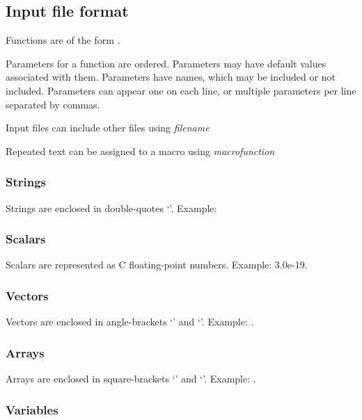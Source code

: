 \documentclass{book}
\begin{document}
\subsection{Input file format}

Functions are of the form .

Parameters for a function are ordered.  Parameters may have default
values associated with them.  Parameters have names, which may be
included or not included.  Parameters can appear one on each line, or
multiple parameters per line separated by commas.

Input files can include other files using \textit{filename}

Repeated text can be assigned to a macro using \textit{macro}\code{ = }\textit{function}

\subsubsection{Strings}

Strings are enclosed in double-quotes `'.  Example: 

\subsubsection{Scalars}

Scalars are represented as C floating-point numbers.  Example: 3.0e-19.

\subsubsection{Vectors} 

Vectors are enclosed in angle-brackets `\code{$<$}' and `\code{$>$}'.  Example: .

\subsubsection{Arrays} 

Arrays are enclosed in square-brackets `\code{[}' and `\code{]}'.  Example: \code{[3e9,$<$3,4,5$>$, "density"]}.

\subsubsection{Variables} 
\end{document}
